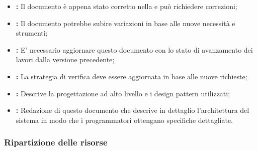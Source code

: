 \documentclass[12pt,a4paper]{article}
\begin{document}
\begin{itemize}
	\item \textbf{\AdR:} 
	Il documento è appena stato corretto nella \RR
	e può richiedere correzioni;
	\item \textbf{\NdP:}
	Il documento potrebbe subire variazioni in base
	alle nuove necessità e strumenti;
	\item \textbf{\PdP:}
	E' necessario aggiornare questo documento con lo stato di avanzamento
	dei lavori dalla versione precedente;
	\item \textbf{\PdQ:}
	La strategia di verifica deve essere aggiornata in base 
	alle nuove richieste;
	\item \textbf{\ST:}
	Descrive la progettazione ad alto livello e i design pattern
	utilizzati;
	\item \textbf{\DP:}
	Redazione di questo documento che descrive in dettaglio l'architettura
	del sistema in modo che i programmatori ottengano specifiche dettagliate.
\end{itemize}

\subsubsection{Ripartizione delle risorse}
\end{document}
